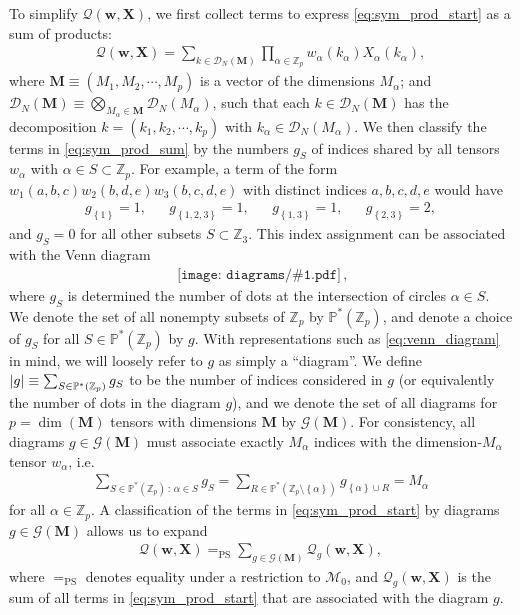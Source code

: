 \documentclass[nofootinbib,notitlepage,11pt]{revtex4-2}
\newcommand{\p}[1]{\left(#1\right)} %
\renewcommand{\set}[1]{\left\{#1\right\}} %
\newcommand{\m}{\bm} %
\newcommand{\1}{\mathds{1}}
\newcommand{\D}{\mathcal{D}}
\newcommand{\G}{\mathcal{G}}
\newcommand{\M}{\mathcal{M}}
\newcommand{\Q}{\mathcal{Q}}
\newcommand{\PP}{\mathbb{P}}
\newcommand{\ZZ}{\mathbb{Z}}
\newcommand{\EQPS}{=_{\text{PS}}}
\newcommand{\diagram}[1]
{\,\texttt{[image: diagrams/\#1.pdf]}\,}
\begin{document}
To simplify $\Q\p{\m w,\m X}$, we first collect terms to express
\eqref{eq:sym_prod_start} as a sum of products:
\begin{align}
  \Q\p{\m w,\m X} = \sum_{k\in\D_N\p{\m M}} \prod_{\alpha\in\ZZ_p}
  w_\alpha\p{k_\alpha} X_\alpha\p{k_\alpha},
  \label{eq:sym_prod_sum}
\end{align}
where $\m M\equiv\p{M_1,M_2,\cdots,M_p}$ is a vector of the dimensions
$M_\alpha$; and
$\D_N\p{\m M}\equiv\bigotimes_{M_\alpha\in\m M}\D_N\p{M_\alpha}$, such
that each $k\in\D_N\p{\m M}$ has the decomposition
$k=\p{k_1,k_2,\cdots,k_p}$ with $k_\alpha\in\D_N\p{M_\alpha}$.  We
then classify the terms in \eqref{eq:sym_prod_sum} by the numbers
$g_S$ of indices shared by all tensors $w_\alpha$ with
$\alpha\in S\subset\ZZ_p$.  For example, a term of the form
$w_1\p{a,b,c} w_2\p{b,d,e} w_3\p{b,c,d,e}$ with distinct indices
$a,b,c,d,e$ would have
\begin{align}
  g_{\set{1}} = 1,
  &&
  g_{\set{1,2,3}} = 1,
  &&
  g_{\set{1,3}} = 1,
  &&
  g_{\set{2,3}} = 2,
\end{align}
and $g_S=0$ for all other subsets $S\subset\ZZ_3$.  This index
assignment can be associated with the Venn diagram
\begin{align}
  \diagram{example_123},
  \label{eq:venn_diagram}
\end{align}
where $g_S$ is determined the number of dots at the intersection of
circles $\alpha\in S$.  We denote the set of all nonempty subsets of
$\ZZ_p$ by $\PP^*\p{\ZZ_p}$, and denote a choice of $g_S$ for all
$S\in\PP^*\p{\ZZ_p}$ by $g$.  With representations such as
\eqref{eq:venn_diagram} in mind, we will loosely refer to $g$ as
simply a ``diagram''.  We define
$\abs{g}\equiv\sum_{S\in\PP^*\p{\ZZ_p}}g_S$ to be the number of
indices considered in $g$ (or equivalently the number of dots in the
diagram $g$), and we denote the set of all diagrams for
$p=\dim\p{\m M}$ tensors with dimensions $\m M$ by $\G\p{\m M}$.  For
consistency, all diagrams $g\in\G\p{\m M}$ must associate exactly
$M_\alpha$ indices with the dimension-$M_\alpha$ tensor $w_\alpha$,
i.e.
\begin{align}
  \sum_{S\in\PP^*\p{\ZZ_p}\,:\,\alpha\in S} g_S
  = \sum_{R\in\PP^*\p{\ZZ_p\setminus\set{\alpha}}} g_{\set{\alpha}\cup R}
  = M_\alpha
\end{align}
for all $\alpha\in\ZZ_p$.  A classification of the terms in
\eqref{eq:sym_prod_start} by diagrams $g\in\G\p{\m M}$ allows us to
expand
\begin{align}
  \Q\p{\m w,\m X} \EQPS \sum_{g\in\G\p{\m M}} \Q_g\p{\m w,\m X},
  \label{eq:sym_prod_diagrams}
\end{align}
where $\EQPS$ denotes equality under a restriction to $\M_0$, and
$\Q_g\p{\m w,\m X}$ is the sum of all terms in
\eqref{eq:sym_prod_start} that are associated with the diagram $g$.
\end{document}
